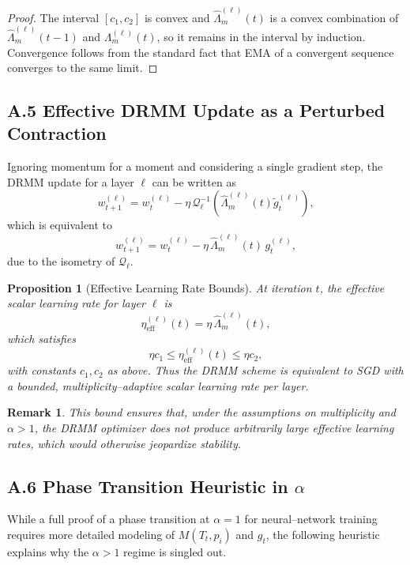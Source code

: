 \documentclass[11pt]{article}
\newtheorem{proposition}{Proposition}
\newtheorem{remark}{Remark}
\begin{document}
\begin{proof}
The interval $[c_1,c_2]$ is convex and $\widehat{\Lambda}_m^{(\ell)}(t)$ is a convex combination of $\widehat{\Lambda}_m^{(\ell)}(t-1)$ and $\Lambda_m^{(\ell)}(t)$, so it remains in the interval by induction. Convergence follows from the standard fact that EMA of a convergent sequence converges to the same limit.
\end{proof}

\subsection*{A.5 Effective DRMM Update as a Perturbed Contraction}

Ignoring momentum for a moment and considering a single gradient step, the DRMM update for a layer $\ell$ can be written as
\begin{equation}
  w_{t+1}^{(\ell)}
  =
  w_t^{(\ell)} - \eta\,\mathcal{Q}_\ell^{-1}(\widehat{\Lambda}_m^{(\ell)}(t)\tilde g_t^{(\ell)}),
\end{equation}
which is equivalent to
\begin{equation}
  w_{t+1}^{(\ell)}
  =
  w_t^{(\ell)} - \eta\,\widehat{\Lambda}_m^{(\ell)}(t)\,g_t^{(\ell)},
\end{equation}
due to the isometry of $\mathcal{Q}_\ell$.

\begin{proposition}[Effective Learning Rate Bounds]
At iteration $t$, the effective scalar learning rate for layer $\ell$ is
\[
  \eta_{\mathrm{eff}}^{(\ell)}(t)
  =
  \eta\,\widehat{\Lambda}_m^{(\ell)}(t),
\]
which satisfies
\[
  \eta c_1 \le \eta_{\mathrm{eff}}^{(\ell)}(t) \le \eta c_2,
\]
with constants $c_1,c_2$ as above. Thus the DRMM scheme is equivalent to SGD with a bounded, multiplicity–adaptive scalar learning rate per layer.
\end{proposition}

\begin{remark}
This bound ensures that, under the assumptions on multiplicity and $\alpha>1$, the DRMM optimizer does not produce arbitrarily large effective learning rates, which would otherwise jeopardize stability.
\end{remark}

\subsection*{A.6 Phase Transition Heuristic in $\alpha$}

While a full proof of a phase transition at $\alpha=1$ for neural–network training requires more detailed modeling of $M(T_t,p_i)$ and $g_t$, the following heuristic explains why the $\alpha>1$ regime is singled out.
\end{document}
